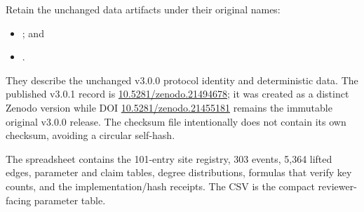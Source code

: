 \documentclass[11pt,a4paper]{article}
\theoremstyle{definition}
\begin{document}
Retain the unchanged data artifacts under their original names:
\begin{itemize}
\item {}; and
\item {}.
\end{itemize}
They describe the unchanged v3.0.0 protocol identity and deterministic data. The published v3.0.1 record is \href{https://doi.org/10.5281/zenodo.21494678}{10.5281/zenodo.21494678}; it was created as a distinct Zenodo version while DOI \href{https://doi.org/10.5281/zenodo.21455181}{10.5281/zenodo.21455181} remains the immutable original v3.0.0 release. The checksum file intentionally does not contain its own checksum, avoiding a circular self-hash.

The spreadsheet contains the 101-entry site registry, 303 events, 5,364 lifted edges, parameter and claim tables, degree distributions, formulas that verify key counts, and the implementation/hash receipts. The CSV is the compact reviewer-facing parameter table.
\end{document}
